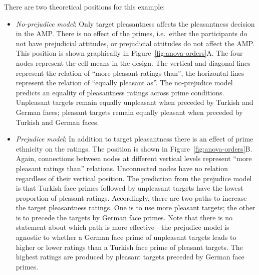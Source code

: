 \documentclass[english,,man]{apa6}
\begin{document}
There are two theoretical positions for this example:

\begin{itemize}
\item
  \emph{No-prejudice model}: Only target pleasantness affects the pleasantness decision in the AMP. There is no effect of the primes, i.e.~either the participants do not have prejudicial attitudes, or prejudicial attitudes do not affect the AMP. This position is shown graphically in Figure~\ref{fig:anova-orders}A. The four nodes represent the cell means in the design. The vertical and diagonal lines represent the relation of \enquote{more pleasant ratings than}, the horizontal lines represent the relation of \enquote{equally pleasant as}. The no-prejudice model predicts an equality of pleasantness ratings across prime conditions. Unpleasant targets remain equally unpleasant when preceded by Turkish and German faces; pleasant targets remain equally pleasant when preceded by Turkish and German faces.
\item
  \emph{Prejudice model}: In addition to target pleasantness there is an effect of prime ethnicity on the ratings. The position is shown in Figure~\ref{fig:anova-orders}B. Again, connections between nodes at different vertical levels represent \enquote{more pleasant ratings than} relations. Unconnected nodes have no relation regardless of their vertical position. The prediction from the prejudice model is that Turkish face primes followed by unpleasant targets have the lowest proportion of pleasant ratings. Accordingly, there are two paths to increase the target pleasantness ratings. One is to use more pleasant targets; the other is to precede the targets by German face primes. Note that there is no statement about which path is more effective---the prejudice model is agnostic to whether a German face prime of unpleasant targets leads to higher or lower ratings than a Turkish face prime of pleasant targets. The highest ratings are produced by pleasant targets preceded by German face primes.
\end{itemize}
\end{document}
